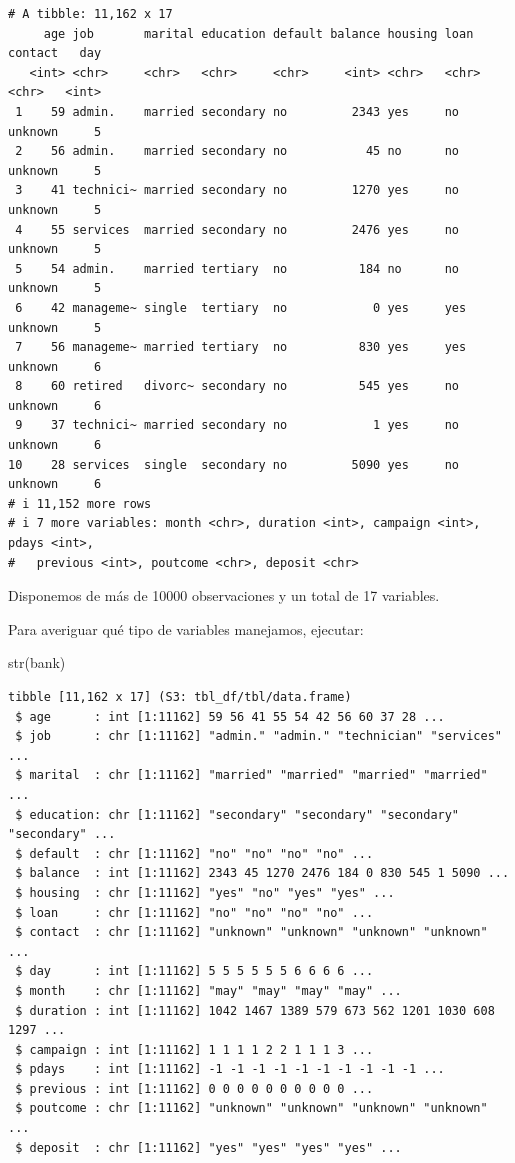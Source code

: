 \documentclass[
  letterpaper,
  DIV=11,
  numbers=noendperiod]{scrreprt}
\newenvironment{Shaded}{\begin{snugshade}}{\end{snugshade}}
\newcommand{\FunctionTok}[1]{\textcolor[rgb]{0.28,0.35,0.67}{#1}}
\newcommand{\NormalTok}[1]{\textcolor[rgb]{0.00,0.23,0.31}{#1}}
\begin{document}
\begin{verbatim}
# A tibble: 11,162 x 17
     age job       marital education default balance housing loan  contact   day
   <int> <chr>     <chr>   <chr>     <chr>     <int> <chr>   <chr> <chr>   <int>
 1    59 admin.    married secondary no         2343 yes     no    unknown     5
 2    56 admin.    married secondary no           45 no      no    unknown     5
 3    41 technici~ married secondary no         1270 yes     no    unknown     5
 4    55 services  married secondary no         2476 yes     no    unknown     5
 5    54 admin.    married tertiary  no          184 no      no    unknown     5
 6    42 manageme~ single  tertiary  no            0 yes     yes   unknown     5
 7    56 manageme~ married tertiary  no          830 yes     yes   unknown     6
 8    60 retired   divorc~ secondary no          545 yes     no    unknown     6
 9    37 technici~ married secondary no            1 yes     no    unknown     6
10    28 services  single  secondary no         5090 yes     no    unknown     6
# i 11,152 more rows
# i 7 more variables: month <chr>, duration <int>, campaign <int>, pdays <int>,
#   previous <int>, poutcome <chr>, deposit <chr>
\end{verbatim}

Disponemos de más de 10000 observaciones y un total de 17 variables.

Para averiguar qué tipo de variables manejamos, ejecutar:

\begin{Shaded}
\begin{Highlighting}[]
\FunctionTok{str}\NormalTok{(bank)}
\end{Highlighting}
\end{Shaded}

\begin{verbatim}
tibble [11,162 x 17] (S3: tbl_df/tbl/data.frame)
 $ age      : int [1:11162] 59 56 41 55 54 42 56 60 37 28 ...
 $ job      : chr [1:11162] "admin." "admin." "technician" "services" ...
 $ marital  : chr [1:11162] "married" "married" "married" "married" ...
 $ education: chr [1:11162] "secondary" "secondary" "secondary" "secondary" ...
 $ default  : chr [1:11162] "no" "no" "no" "no" ...
 $ balance  : int [1:11162] 2343 45 1270 2476 184 0 830 545 1 5090 ...
 $ housing  : chr [1:11162] "yes" "no" "yes" "yes" ...
 $ loan     : chr [1:11162] "no" "no" "no" "no" ...
 $ contact  : chr [1:11162] "unknown" "unknown" "unknown" "unknown" ...
 $ day      : int [1:11162] 5 5 5 5 5 5 6 6 6 6 ...
 $ month    : chr [1:11162] "may" "may" "may" "may" ...
 $ duration : int [1:11162] 1042 1467 1389 579 673 562 1201 1030 608 1297 ...
 $ campaign : int [1:11162] 1 1 1 1 2 2 1 1 1 3 ...
 $ pdays    : int [1:11162] -1 -1 -1 -1 -1 -1 -1 -1 -1 -1 ...
 $ previous : int [1:11162] 0 0 0 0 0 0 0 0 0 0 ...
 $ poutcome : chr [1:11162] "unknown" "unknown" "unknown" "unknown" ...
 $ deposit  : chr [1:11162] "yes" "yes" "yes" "yes" ...
\end{verbatim}
\end{document}

